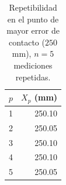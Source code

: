 \begin{table}[H]
\centering
\caption{Repetibilidad en el punto de mayor error de contacto ($250$ mm), $n = 5$ mediciones repetidas.}
\label{tab:pie-rey-repetibilidad}
\begin{tabular}{rr}
\toprule
$p$ & $X_p$ (mm) \\
\midrule
1 & 250.10 \\
2 & 250.05 \\
3 & 250.10 \\
4 & 250.10 \\
5 & 250.05 \\
\bottomrule
\end{tabular}
\end{table}
